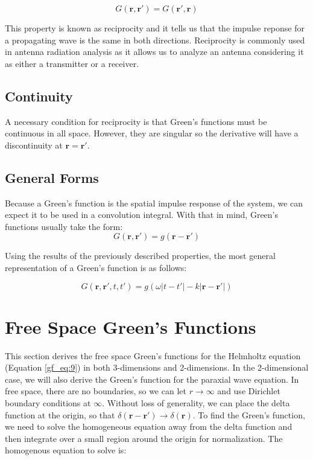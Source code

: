 \begin{equation}
G\left(\mathbf{r},\mathbf{r}' \right) = G\left(\mathbf{r}',\mathbf{r} \right)
\label{gf_eq:18c}
\end{equation}
\renewcommand{\baselinestretch}{2} \small\normalsize

This property is known as reciprocity and it tells us that the impulse reponse for a propagating wave is the same in both directions. Reciprocity is commonly used in antenna radiation analysis as it allows us to analyze an antenna considering it as either a transmitter or a receiver.

\subsection {Continuity} \label{gf_sec:continuity}
A necessary condition for reciprocity is that Green's functions must be continuous in all space. However, they are singular so the derivative will have a discontinuity at $\mathbf{r} = \mathbf{r}'$.

\subsection {General Forms}
Because a Green's function is the spatial impulse response of the system, we can expect it to be used in a convolution integral. With that in mind, Green's functions usually take the form:
\begin{equation}
G\left(\mathbf{r},\mathbf{r}' \right) = g\left( \mathbf{r} - \mathbf{r}'\right)
\label{gf_eq:18d}
\end{equation}
\renewcommand{\baselinestretch}{2} \small\normalsize

Using the results of the previously described properties, the most general representation of a Green's function is as follows:

\begin{equation}
G\left(\mathbf{r},\mathbf{r}',t ,t'\right) = g\left(\omega |t-t'| - k| \mathbf{r} - \mathbf{r}' | \right)
\label{gf_eq:19b}
\end{equation}
\renewcommand{\baselinestretch}{2} \small\normalsize

\section {Free Space Green's Functions}
This section derives the free space Green's functions for the Helmholtz equation (Equation \ref{gf_eq:9}) in both 3-dimensions and 2-dimensions. In the 2-dimensional case, we will also derive the Green's function for the paraxial wave equation. In free space, there are no boundaries, so we can let $r\rightarrow \infty$ and use Dirichlet boundary conditions at $\infty$. Without loss of generality, we can place the delta function at the origin, so that $\delta\left(\mathbf{r}-\mathbf{r}' \right) \rightarrow \delta \left(\mathbf{r} \right)$. To find the Green's function, we need to solve the homogeneous equation away from the delta function and then integrate over a small region around the origin for normalization. The homogenous equation to solve is:

